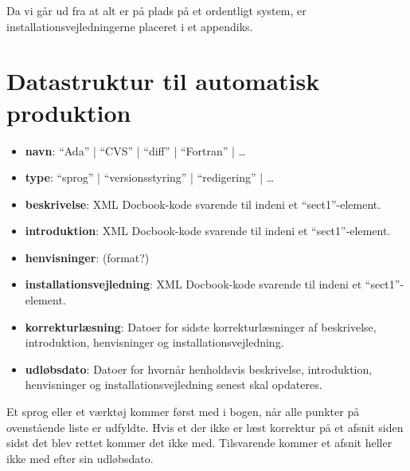 \documentclass[a4paper]{article}
\begin{document}
 Da vi går ud fra at alt er på plads på et ordentligt system, er
 installationsvejledningerne placeret i et appendiks.

 \section{Datastruktur til automatisk produktion}

 \begin{itemize}
  \item{\bf navn}: ``Ada'' | ``CVS'' | ``diff'' | ``Fortran'' | \ldots
  \item{\bf type}: ``sprog'' | ``versionsstyring'' | ``redigering'' |
    \ldots
  \item{\bf beskrivelse}: XML Docbook-kode svarende til indeni et
    ``sect1''-element.
  \item{\bf introduktion}: XML Docbook-kode svarende til indeni et
    ``sect1''-element.
  \item{\bf henvisninger}: (format?)
  \item{\bf installationsvejledning}: XML Docbook-kode svarende til
    indeni et ``sect1''-element.
  \item{\bf korrekturlæsning}: Datoer for sidste korrekturlæsninger af
    beskrivelse, introduktion, henvisninger og
    installationsvejledning.
  \item{\bf udløbsdato}: Datoer for hvornår henholdsvis beskrivelse,
    introduktion, henvisninger og installationsvejledning senest skal
    opdateres.
 \end{itemize}
 
 Et sprog eller et værktøj kommer først med i bogen, når alle punkter
 på ovenstående liste er udfyldte. Hvis et der ikke er læst korrektur
 på et afsnit siden sidst det blev rettet kommer det ikke med.
 Tilsvarende kommer et afsnit heller ikke med efter sin udløbsdato.
\end{document}
